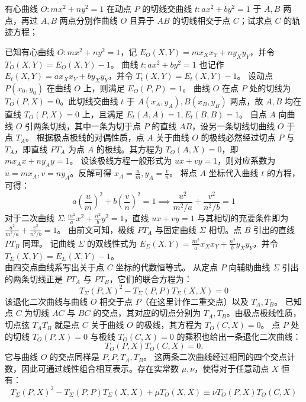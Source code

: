 \begin{example}
有心曲线 $O: mx^2 + ny^2 = 1$ 在动点 $P$ 的切线交曲线 $t: ax^2 + by^2 = 1$ 于 $A,B$ 两点，再过 $A,B$ 两点分别作曲线 $O$ 且异于 $AB$ 的切线相交于点 $C$；试求点 $C$ 的轨迹方程；
\end{example}
\begin{solution}
已知有心曲线 $O: mx^2 + ny^2 = 1$，记 $E_O(X, Y) = m x_X x_Y + n y_X y_Y$，并令 $T_O(X, Y) = E_O(X, Y) - 1$。
曲线 $t: ax^2 + by^2 = 1$ 也记作 $E_t(X, Y) = a x_X x_Y + b y_X y_Y$，并令 $T_t(X, Y) = E_t(X, Y) - 1$。
设动点 $P(x_0, y_0)$ 在曲线 $O$ 上，则满足 $E_O(P, P) = 1$。
曲线 $O$ 在点 $P$ 处的切线为 $T_O(P, X) = 0$。此切线交曲线 $t$ 于 $A(x_A, y_A), B(x_B, y_B)$ 两点，故 $A, B$ 均在直线 $T_O(P, X) = 0$ 上，且满足 $E_t(A, A) = 1, E_t(B, B) = 1$。
自点 $A$ 向曲线 $O$ 引两条切线，其中一条为切于点 $P$ 的直线 $AB$，设另一条切线切曲线 $O$ 于点 $T_A$。
根据极点极线的对偶性质，点 $A$ 关于曲线 $O$ 的极线必然经过切点 $P$ 与 $T_A$，即直线 $P T_A$ 为点 $A$ 的极线。其方程为 $T_O(A, X) = 0$，即 $m x_A x + n y_A y = 1$。
设该极线方程一般形式为 $u x + v y = 1$，则对应系数为 $u = m x_A, v = n y_A$。反解可得 $x_A = \frac{u}{m}, y_A = \frac{v}{n}$。
将点 $A$ 坐标代入曲线 $t$ 的方程，可得：
\[ a \left(\frac{u}{m}\right)^2 + b \left(\frac{v}{n}\right)^2 = 1 \implies \frac{u^2}{m^2/a} + \frac{v^2}{n^2/b} = 1 \]
对于二次曲线 $\Sigma: \frac{m^2}{a}x^2 + \frac{n^2}{b}y^2 = 1$，直线 $u x + v y = 1$ 与其相切的充要条件即为 $\frac{u^2}{m^2/a} + \frac{v^2}{n^2/b} = 1$。
由前文可知，极线 $P T_A$ 与固定曲线 $\Sigma$ 相切。点 $B$ 引出的直线 $P T_B$ 同理。
记曲线 $\Sigma$ 的双线性式为 $E_{\Sigma}(X, Y) = \frac{m^2}{a} x_X x_Y + \frac{n^2}{b} y_X y_Y$，并令 $T_{\Sigma}(X, Y) = E_{\Sigma}(X, Y) - 1$。\\
由四交点曲线系写出关于点 $C$ 坐标的代数恒等式。
从定点 $P$ 向辅助曲线 $\Sigma$ 引出的两条切线正是 $P T_A$ 与 $P T_B$，它们的联合方程为：
\[ T_{\Sigma}(P, X)^2 - T_{\Sigma}(P, P) T_{\Sigma}(X, X) = 0 \]
该退化二次曲线与曲线 $O$ 相交于点 $P$（在这里计作二重交点）以及 $T_A, T_B$。
已知点 $C$ 为切线 $A C$ 与 $B C$ 的交点，其对应的切点分别为 $T_A, T_B$。由极点极线性质，切点弦 $T_A T_B$ 就是点 $C$ 关于曲线 $O$ 的极线，其方程为 $T_O(C, X) = 0$。
点 $P$ 处的切线 $T_O(P, X) = 0$ 与极线 $T_O(C, X) = 0$ 的乘积也给出一条退化二次曲线：
\[ T_O(P, X) T_O(C, X) = 0. \]
它与曲线 $O$ 的交点同样是 $P, P, T_A, T_B$。
这两条二次曲线经过相同的四个交点计数，因此可通过线性组合相互表示。存在实常数 $\mu, \nu$，使得对于任意动点 $X$ 恒有：
\[ T_{\Sigma}(P, X)^2 - T_{\Sigma}(P, P) T_{\Sigma}(X, X) + \mu T_O(X, X) \equiv \nu T_O(P, X) T_O(C, X) \]

\end{solution}

